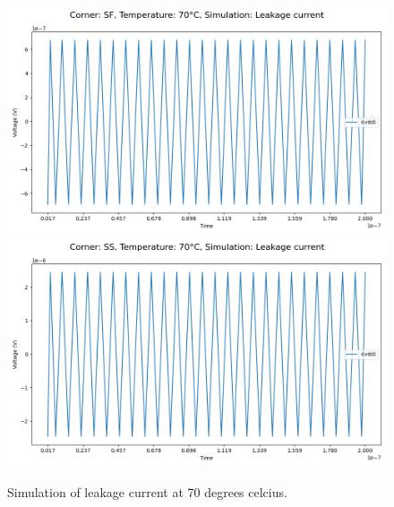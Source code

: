 \begin{figure}[H]
    \vspace{5pt}
    \includegraphics[height= 0.21\textheight]{figures/aimspice/SF/70/I.csv.png}
    \vspace{5pt}
    \includegraphics[height= 0.21\textheight]{figures/aimspice/SS/70/I.csv.png}
    \caption{Simulation of leakage current at 70 degrees celcius.}
    \label{fig:aimspice_I_70}
\end{figure}

